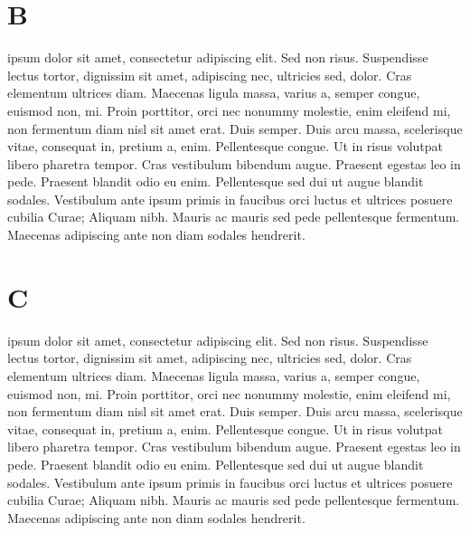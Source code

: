 \documentclass{article}
\begin{document}
\pend
\endnumbering

\section{B}


\beginnumbering
\pstart
{}       ipsum dolor sit amet, consectetur adipiscing elit. Sed non risus. Suspendisse lectus tortor, dignissim sit amet, adipiscing nec, ultricies sed, dolor. Cras elementum ultrices diam. Maecenas ligula massa, varius a, semper congue, euismod non, mi. Proin porttitor, orci nec nonummy molestie, enim  eleifend mi, non fermentum diam nisl sit amet erat. Duis semper. Duis arcu massa, scelerisque vitae, consequat in, pretium a, enim. Pellentesque congue. Ut in risus volutpat libero pharetra tempor. Cras vestibulum bibendum augue. Praesent egestas leo in pede. Praesent blandit odio eu enim. Pellentesque sed dui ut augue blandit sodales. Vestibulum ante ipsum primis in faucibus orci luctus et ultrices posuere cubilia Curae; Aliquam nibh. Mauris ac mauris sed pede pellentesque fermentum. Maecenas adipiscing ante non diam sodales hendrerit. 

\pend
\endnumbering

\section{C}


\beginnumbering
\pstart
{}       ipsum dolor sit amet, consectetur adipiscing elit. Sed non risus. Suspendisse lectus tortor, dignissim sit amet, adipiscing nec, ultricies sed, dolor. Cras elementum ultrices diam. Maecenas ligula massa, varius a, semper congue, euismod non, mi. Proin porttitor, orci nec nonummy molestie, enim  eleifend mi, non fermentum diam nisl sit amet erat. Duis semper. Duis arcu massa, scelerisque vitae, consequat in, pretium a, enim. Pellentesque congue. Ut in risus volutpat libero pharetra tempor. Cras vestibulum bibendum augue. Praesent egestas leo in pede. Praesent blandit odio eu enim. Pellentesque sed dui ut augue blandit sodales. Vestibulum ante ipsum primis in faucibus orci luctus et ultrices posuere cubilia Curae; Aliquam nibh. Mauris ac mauris sed pede pellentesque fermentum. Maecenas adipiscing ante non diam sodales hendrerit. 
\end{document}
